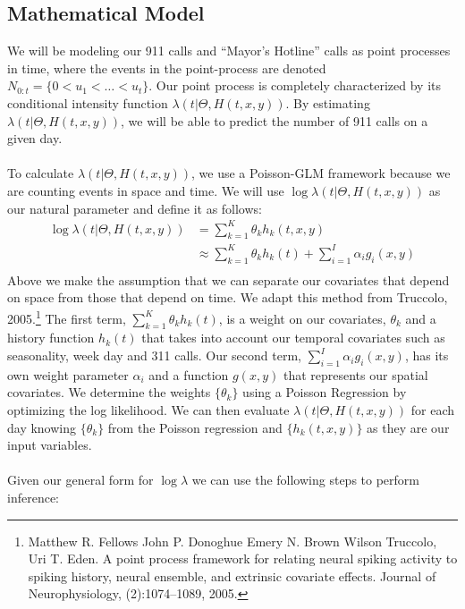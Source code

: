 \documentclass[a0,final]{a0poster}
\begin{document}
\begin{multicols}{3}
\section*{Mathematical Model}
We will be modeling our 911 calls and ``Mayor's Hotline'' calls as point processes in time, where the events in the point-process are denoted $N_{0:t} = \{ 0 < u_1 < \hdots < u_t \}$. Our point process is completely characterized by its conditional intensity function $\lambda(t|\Theta, H(t, x, y))$. By estimating  $\lambda(t|\Theta, H(t, x, y))$, we will be able to predict the number of 911 calls on a given day.\\
\\
To calculate $\lambda(t|\Theta, H(t, x, y))$, we use a Poisson-GLM framework because we are counting events in space and time. We will use $\log \lambda(t|\Theta, H(t, x, y))$ as our natural parameter and define it as follows: \\
\begin{align*}
\log \lambda(t|\Theta, H(t, x, y)) &= \sum_{k=1}^K \theta_k h_k(t,x,y) \\
&\approx \sum_{k=1}^K \theta_k h_k(t) + \sum_{i=1}^I \alpha_i g_i(x,y) \\
\end{align*}
Above we make the assumption that we can separate our covariates that depend on space from those that depend on time. We adapt this method from Truccolo, 2005.\footnote{Matthew R. Fellows John P. Donoghue Emery N. Brown Wilson Truccolo, Uri T. Eden. A point process framework for relating neural spiking activity to spiking history, neural ensemble, and extrinsic covariate effects. Journal of Neurophysiology, (2):1074–1089, 2005.} The first term, $\sum_{k=1}^K \theta_k h_k(t)$, is a weight on our covariates, $\theta_k$ and a history function $h_k(t)$ that takes into account our temporal covariates such as seasonality, week day and 311 calls. Our second term, $\sum_{i=1}^I \alpha_i g_i(x,y)$, has its own weight parameter $\alpha_i$ and a function $g(x,y)$ that represents our spatial covariates. We determine the weights $\{\theta_k\}$ using a Poisson Regression by optimizing the log likelihood. We can then evaluate $\lambda(t|\Theta, H(t, x, y))$ for each day knowing $\{\theta_k\}$ from the Poisson regression and $\{h_k(t,x,y)\}$ as they are our input variables.\\
\\
\noindent Given our general form for $\log \lambda$ we can use the following steps to perform inference:
\begin{enumerate}

\end{enumerate}
\end{multicols}
\end{document}
